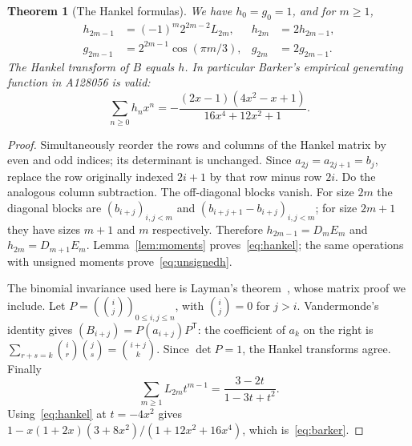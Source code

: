 \documentclass[11pt]{article}
\newtheorem{theorem}{Theorem}
\begin{document}
\begin{theorem}[The Hankel formulas]\label{thm:hankel}
We have $h_0=g_0=1$, and for $m\geq1$,
\begin{align}
 h_{2m-1}&=(-1)^m2^{2m-2}L_{2m},& h_{2m}&=2h_{2m-1},\label{eq:hankel}\\
 g_{2m-1}&=2^{2m-1}\cos(\pi m/3),& g_{2m}&=2g_{2m-1}.\label{eq:unsignedh}
\end{align}
The Hankel transform of $B$ equals $h$. In particular Barker's
empirical generating function in A128056 is valid:
\begin{equation}\label{eq:barker}
 \sum_{n\geq0}h_nx^n=
 -\frac{(2x-1)(4x^2-x+1)}{16x^4+12x^2+1}.
\end{equation}
\end{theorem}
\begin{proof}
Simultaneously reorder the rows and columns of the Hankel matrix by
even and odd indices; its determinant is unchanged. Since
$a_{2j}=a_{2j+1}=b_j$, replace the
row originally indexed $2i+1$ by that row minus row $2i$.
Do the analogous column subtraction. The off-diagonal blocks vanish.
For size $2m$ the diagonal blocks are
$(b_{i+j})_{i,j<m}$ and $(b_{i+j+1}-b_{i+j})_{i,j<m}$;
for size $2m+1$ they have sizes $m+1$ and $m$ respectively.
Therefore
$h_{2m-1}=D_mE_m$ and $h_{2m}=D_{m+1}E_m$.
Lemma~\ref{lem:moments} proves~\eqref{eq:hankel}; the same operations
with unsigned moments prove~\eqref{eq:unsignedh}.

The binomial invariance used here is Layman's theorem~\cite[Theorem~1]{layman},
whose matrix proof we include. Let $P=(\binom ij)_{0\leq i,j\leq n}$,
with $\binom ij=0$ for $j>i$.
Vandermonde's identity gives
$(B_{i+j})=P(a_{i+j})P^{\mathsf T}$: the coefficient of $a_k$ on the
right is $\sum_{r+s=k}\binom ir\binom js=\binom{i+j}k$.
Since $\det P=1$, the Hankel transforms agree.
Finally
\[
 \sum_{m\geq1}L_{2m}t^{m-1}=\frac{3-2t}{1-3t+t^2}.
\]
Using~\eqref{eq:hankel} at $t=-4x^2$ gives
$1-x(1+2x)(3+8x^2)/(1+12x^2+16x^4)$, which is~\eqref{eq:barker}.
\end{proof}
\end{document}

